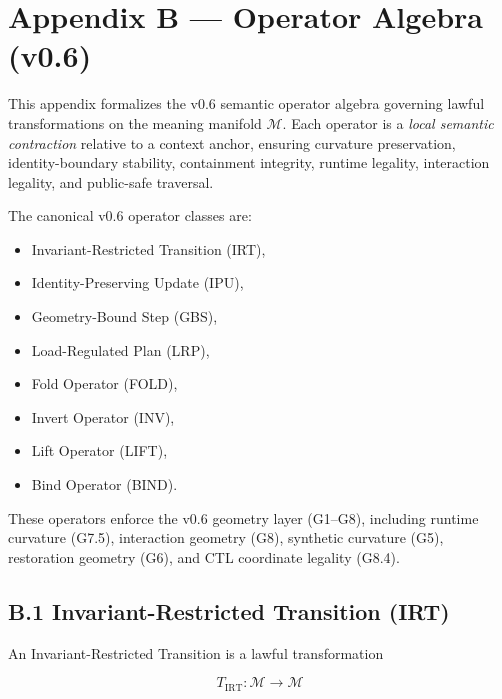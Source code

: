 \section*{Appendix B — Operator Algebra (v0.6)}

\noindent This appendix formalizes the v0.6 semantic operator algebra governing
lawful transformations on the meaning manifold $\mathcal{M}$. Each operator is a
\textit{local semantic contraction} relative to a context anchor, ensuring
curvature preservation, identity-boundary stability, containment integrity,
runtime legality, interaction legality, and public-safe traversal.

\medskip

\noindent The canonical v0.6 operator classes are:

\begin{itemize}
    \item Invariant-Restricted Transition (IRT),
    \item Identity-Preserving Update (IPU),
    \item Geometry-Bound Step (GBS),
    \item Load-Regulated Plan (LRP),
    \item Fold Operator (FOLD),
    \item Invert Operator (INV),
    \item Lift Operator (LIFT),
    \item Bind Operator (BIND).
\end{itemize}

\noindent These operators enforce the v0.6 geometry layer (G1--G8), including
runtime curvature (G7.5), interaction geometry (G8), synthetic curvature (G5),
restoration geometry (G6), and CTL coordinate legality (G8.4).


\subsection*{B.1 Invariant-Restricted Transition (IRT)}

\noindent An Invariant-Restricted Transition is a lawful transformation



\[
T_{\mathrm{IRT}} : \mathcal{M} \rightarrow \mathcal{M}
\]



